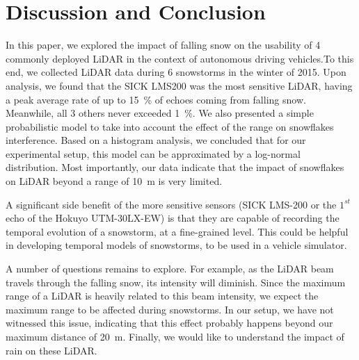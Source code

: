 \section{Discussion and Conclusion}

In this paper, we explored the impact of falling snow on the usability of 4 commonly deployed LiDAR in the context of autonomous driving vehicles.To this end, we collected LiDAR data during 6 snowstorms in the winter of 2015. Upon analysis, we found that the SICK LMS200 was the most sensitive LiDAR, having a peak average rate of up to 15~\% of echoes coming from falling snow. Meanwhile, all 3 others never exceeded 1~\%. We also presented a simple probabilistic model to take into account the effect of the range on snowflakes interference. Based on a histogram analysis, we concluded that for our experimental setup, this model can be approximated by a log-normal distribution. Most importantly, our data indicate that the impact of snowflakes on LiDAR beyond a range of \SI{10}{\meter} is very limited. 

A significant side benefit of the more sensitive sensors (SICK LMS-200 or the $1^{st}$ echo of the Hokuyo UTM-30LX-EW) is that they are capable of recording the temporal evolution of a snowstorm, at a fine-grained level. This could be helpful in developing temporal models of snowstorms, to be used in a vehicle simulator.

A number of questions remains to explore. For example, as the LiDAR beam travels through the falling snow, its intensity will diminish. Since the maximum range of a LiDAR is heavily related to this beam intensity, we expect the maximum range to be affected during snowstorms. In our setup, we have not witnessed this issue, indicating that this effect probably happens beyond our maximum distance of \SI{20}{\meter}. Finally, we would like to understand the impact of rain on these LiDAR. 

